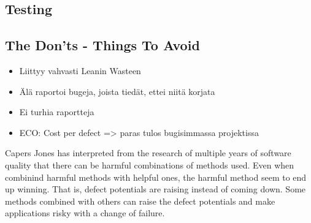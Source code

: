  \subsection{Testing}
 
 \subsection{The Don'ts - Things To Avoid}
 
 \begin{itemize}
 
 \item Liittyy vahvasti Leanin Wasteen
 \item Älä raportoi bugeja, joista tiedät, ettei niitä korjata
 \item Ei turhia raportteja
 \item ECO: Cost per defect => paras tulos bugisimmassa projektissa
 
 \end{itemize}


Capers Jones has interpreted from the research of multiple years of software quality that there can be harmful combinations of methods used. Even when combinind harmful methods with helpful ones, the harmful method seem to end up winning. That is, defect potentials are raising instead of coming down. Some methods combined with others can raise the defect potentials and make applications risky with a change of failure.
